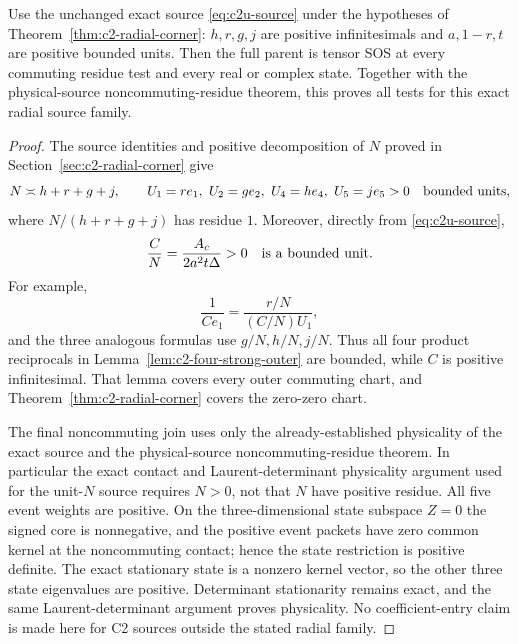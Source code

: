 \begin{corollary}
\label{cor:c2-radial-outer}
Use the unchanged exact source \eqref{eq:c2u-source} under the hypotheses
of Theorem~\ref{thm:c2-radial-corner}: $h,r,g,j$ are positive
infinitesimals and $a,1-r,t$ are positive bounded units.
Then the full parent is tensor SOS at every commuting residue test and
every real or complex state.  Together with the physical-source
noncommuting-residue theorem, this proves all tests for this exact
radial source family.
\end{corollary}
\begin{proof}
The source identities and positive decomposition of $N$ proved in
Section~\ref{sec:c2-radial-corner} give
\[
 N\asymp h+r+g+j,\qquad
 U_1=re_1,\ U_2=ge_2,\ U_4=he_4,\ U_5=je_5>0
 \quad\hbox{bounded units},
\]
where $N/(h+r+g+j)$ has residue $1$.  Moreover, directly from
\eqref{eq:c2u-source},
\[
 \frac CN=\frac{A_c}{2a^2t\Delta}>0
 \quad\hbox{is a bounded unit}.
\]
For example,
\[
 \frac1{Ce_1}=\frac{r/N}{(C/N)U_1},
\]
and the three analogous formulas use $g/N,h/N,j/N$.
Thus all four product reciprocals in
Lemma~\ref{lem:c2-four-strong-outer} are bounded, while $C$ is positive
infinitesimal.  That lemma covers every outer commuting chart, and
Theorem~\ref{thm:c2-radial-corner} covers the zero-zero chart.

The final noncommuting join uses only the already-established
physicality of the exact source and the physical-source
noncommuting-residue theorem.  In particular the exact contact and
Laurent-determinant physicality argument used for the unit-$N$ source
requires $N>0$, not that $N$ have positive residue.  All five event
weights are positive.  On the three-dimensional state subspace $Z=0$
the signed core is nonnegative, and the positive event packets have
zero common kernel at the noncommuting contact; hence the state
restriction is positive definite.  The exact stationary state is a
nonzero kernel vector, so the other three state eigenvalues are positive.
Determinant stationarity remains exact, and the same Laurent-determinant
argument proves physicality.
No coefficient-entry claim is made here for C2 sources outside the
stated radial family.
\end{proof}

